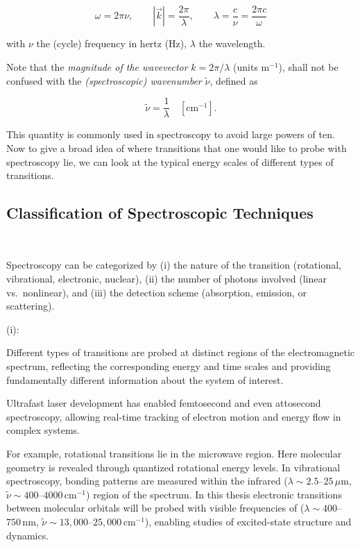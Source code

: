 \begin{equation}
	\omega = 2\pi\nu, \qquad |\vec{k}| = \frac{2\pi}{\lambda}, \qquad \lambda = \frac{c}{\nu} = \frac{2\pi c}{\omega}
	\label{eq:wavelength_frequency_relation}
\end{equation}

\noindent 
with $\nu$ the (cycle) frequency in hertz (Hz), $\lambda$ the wavelength. 

\noindent 
Note that the \emph{magnitude of the wavevector } $k = 2\pi/\lambda$ (units m$^{-1}$), shall not be confused with the \emph{(spectroscopic) wavenumber} $\tilde{\nu}$, defined as

\begin{equation}
	\tilde{\nu} = \frac{1}{\lambda} \quad [\mathrm{cm}^{-1}].
	\label{eq:wavenumber_definition}
\end{equation}

This quantity is commonly used in spectroscopy to avoid large powers of ten. 
Now to give a broad idea of where transitions that one would like to probe with spectroscopy lie, we can look at the typical energy scales of different types of transitions.

\subsection{Classification of Spectroscopic Techniques}
\

\noindent
Spectroscopy can be categorized by (i) the nature of the transition (rotational, vibrational, electronic, nuclear), (ii) the number of photons involved (linear vs.\ nonlinear), and (iii) the detection scheme (absorption, emission, or scattering). 

\noindent
(i):

\noindent
Different types of transitions are probed at distinct regions of the electromagnetic spectrum, reflecting the corresponding energy and time scales and providing fundamentally different information about the system of interest. 

\noindent
Ultrafast laser development has enabled femtosecond and even attosecond spectroscopy, allowing real-time tracking of electron motion and energy flow in complex systems.

\noindent
For example, rotational transitions lie in the microwave region. Here molecular geometry is revealed through quantized rotational energy levels. In vibrational spectroscopy, bonding patterns are measured within the infrared ($\lambda\!\sim\!2.5$–$25\,\mu\mathrm{m}$, $\tilde{\nu}\!\sim\!400$–$4000\,\mathrm{cm^{-1}}$) region of the spectrum. In this thesis electronic transitions between molecular orbitals will be probed with visible frequencies of  ($\lambda\!\sim\!400$–$750\,\mathrm{nm}$, $\tilde{\nu}\!\sim\!13{,}000$–$25{,}000\,\mathrm{cm^{-1}}$), enabling studies of excited-state structure and dynamics.

